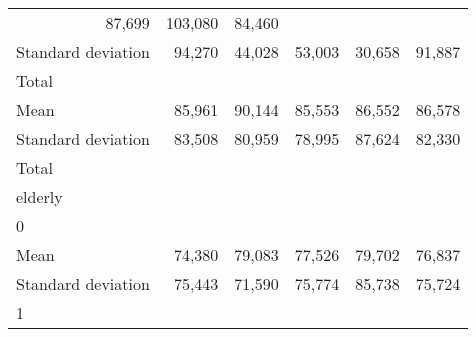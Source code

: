 \begin{tabular}{llllll}
  \multicolumn{1}{r}{87,699} &
  \multicolumn{1}{r}{103,080} &
  \multicolumn{1}{r}{84,460} \\
\multicolumn{1}{l}{\hspace{4em}Standard deviation} &
  \multicolumn{1}{|r}{94,270} &
  \multicolumn{1}{r}{44,028} &
  \multicolumn{1}{r}{53,003} &
  \multicolumn{1}{r}{30,658} &
  \multicolumn{1}{r}{91,887} \\
\multicolumn{1}{l}{\hspace{3em}Total} &
  \multicolumn{1}{|r}{} &
  \multicolumn{1}{r}{} &
  \multicolumn{1}{r}{} &
  \multicolumn{1}{r}{} &
  \multicolumn{1}{r}{} \\
\multicolumn{1}{l}{\hspace{4em}Mean} &
  \multicolumn{1}{|r}{85,961} &
  \multicolumn{1}{r}{90,144} &
  \multicolumn{1}{r}{85,553} &
  \multicolumn{1}{r}{86,552} &
  \multicolumn{1}{r}{86,578} \\
\multicolumn{1}{l}{\hspace{4em}Standard deviation} &
  \multicolumn{1}{|r}{83,508} &
  \multicolumn{1}{r}{80,959} &
  \multicolumn{1}{r}{78,995} &
  \multicolumn{1}{r}{87,624} &
  \multicolumn{1}{r}{82,330} \\
\multicolumn{1}{l}{\hspace{1em}Total} &
  \multicolumn{1}{|r}{} &
  \multicolumn{1}{r}{} &
  \multicolumn{1}{r}{} &
  \multicolumn{1}{r}{} &
  \multicolumn{1}{r}{} \\
\multicolumn{1}{l}{\hspace{2em}elderly} &
  \multicolumn{1}{|r}{} &
  \multicolumn{1}{r}{} &
  \multicolumn{1}{r}{} &
  \multicolumn{1}{r}{} &
  \multicolumn{1}{r}{} \\
\multicolumn{1}{l}{\hspace{3em}0} &
  \multicolumn{1}{|r}{} &
  \multicolumn{1}{r}{} &
  \multicolumn{1}{r}{} &
  \multicolumn{1}{r}{} &
  \multicolumn{1}{r}{} \\
\multicolumn{1}{l}{\hspace{4em}Mean} &
  \multicolumn{1}{|r}{74,380} &
  \multicolumn{1}{r}{79,083} &
  \multicolumn{1}{r}{77,526} &
  \multicolumn{1}{r}{79,702} &
  \multicolumn{1}{r}{76,837} \\
\multicolumn{1}{l}{\hspace{4em}Standard deviation} &
  \multicolumn{1}{|r}{75,443} &
  \multicolumn{1}{r}{71,590} &
  \multicolumn{1}{r}{75,774} &
  \multicolumn{1}{r}{85,738} &
  \multicolumn{1}{r}{75,724} \\
\multicolumn{1}{l}{\hspace{3em}1} &

\end{tabular}
